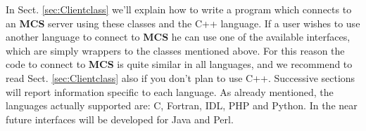 \documentclass[12pt,titlepage]{article}
\newcommand{\mcs}{\textbf{MCS} }
\begin{document}
\noindent In Sect. \ref{sec:Clientclass} we'll explain how to write a
program which connects to an \mcs server using these classes and the
C++ language. If a user wishes to use another language to connect to
\mcs he can use one of the available interfaces, which are simply wrappers
to the classes mentioned above. For this reason the code to connect to
\mcs is quite similar in all languages, and we recommend to read
Sect. \ref{sec:Clientclass} also if you don't plan to use
C++. Successive sections will report information specific to each
language. As already mentioned, the languages actually supported are:
C, Fortran, IDL, PHP and Python.
In the near future interfaces will be developed for Java and Perl.
%
%
%
%
\end{document}
